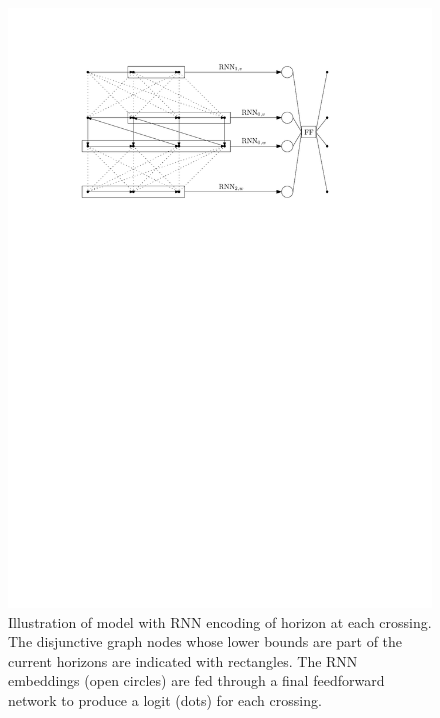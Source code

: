 \documentclass[a4paper]{article}
\theoremstyle{definition}
\theoremstyle{plain}
\begin{document}
\begin{figure}
  \centering
  \includegraphics[scale=1]{figures/network/rnn_model}
  \caption{Illustration of model with RNN encoding of horizon at each crossing.
    The disjunctive graph nodes whose lower bounds are part of the current
    horizons are indicated with rectangles. The RNN embeddings (open circles)
    are fed through a final feedforward network to produce a logit (dots) for
    each crossing.}
  \label{fig:rnn_model}
\end{figure}
\end{document}
